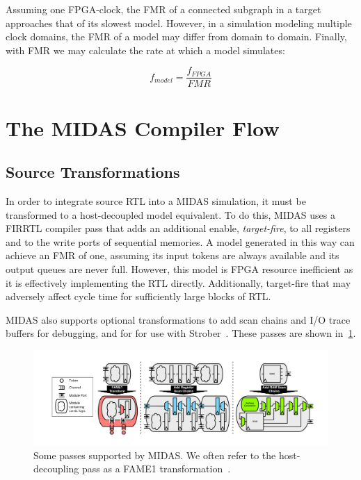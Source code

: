 \noindent Assuming one FPGA-clock, the FMR of a connected subgraph in a target
approaches that of its slowest model. However, in a simulation modeling
multiple clock domains, the FMR of a model may differ from domain to domain.
Finally, with FMR we may calculate the rate at which a model simulates:

$$ f_{model} = \frac{f_{FPGA}}{FMR} $$

\section{The MIDAS Compiler Flow}

\subsection{Source Transformations}\label{sec:source-transformations}

In order to integrate source RTL into a MIDAS simulation, it must be
transformed to a host-decoupled model equivalent.  To do this, MIDAS uses a
FIRRTL compiler pass that adds an additional enable, \emph{target-fire}, to all
registers and to the write ports of sequential memories. A model generated in
this way can achieve an FMR of one, assuming its input tokens are always
available and its output queues are never full.  However, this model is FPGA
resource inefficient as it is effectively implementing the RTL directly.
Additionally, target-fire that may adversely affect cycle time for sufficiently
large blocks of RTL.

MIDAS also supports optional transformations to add scan chains and I/O trace
buffers for debugging, and for for use with Strober~\cite{strober}. These passes
are shown in~\ref{fig:midas-passes}.

\begin{figure}
	\centering
	\includegraphics[width=16cm]{figures/midas-passes.pdf}
    \caption{Some passes supported by MIDAS. We often refer to the
    host-decoupling pass as a FAME1 transformation~\cite{fame}.}
	\label{fig:midas-passes}
	\centering
\end{figure}

